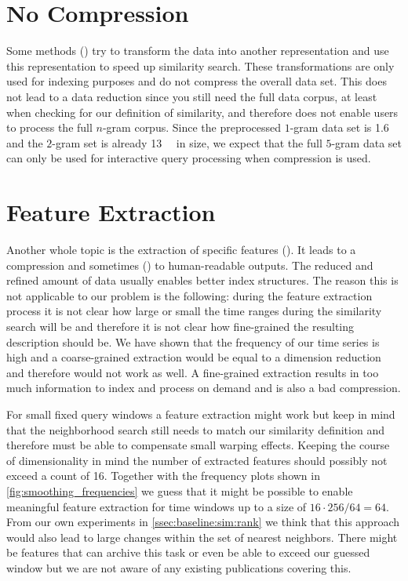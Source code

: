 \section{No Compression}
\label{sec:prior:nocompression}

Some methods (\cite{dimred3,dimred4}) try to transform the data into another representation and use this representation to speed up similarity search. These transformations are only used for indexing purposes and do not compress the overall data set. This does not lead to a data reduction since you still need the full data corpus, at least when checking for our definition of similarity, and therefore does not enable users to process the full $n$-gram corpus. Since the preprocessed $1$-gram data set is \SI{1.6}{\giga\byte} and the $2$-gram set is already \SI{13}{\giga\byte} in size, we expect that the full $5$-gram data set can only be used for interactive query processing when compression is used.



\section{Feature Extraction}
\label{sec:prior:extract}

Another whole topic is the extraction of specific features (\cite{compress1,compress2,compress3,compress4,compress5}). It leads to a compression and sometimes (\cite{compress1}) to human-readable outputs. The reduced and refined amount of data usually enables better index structures. The reason this is not applicable to our problem is the following: during the feature extraction process it is not clear how large or small the time ranges during the similarity search will be and therefore it is not clear how fine-grained the resulting description should be. We have shown that the frequency of our time series is high and a coarse-grained extraction would be equal to a dimension reduction and therefore would not work as well. A fine-grained extraction results in too much information to index and process on demand and is also a bad compression.

For small fixed query windows a feature extraction might work but keep in mind that the neighborhood search still needs to match our similarity definition and therefore must be able to compensate small warping effects. Keeping the course of dimensionality in mind the number of extracted features should possibly not exceed a count of \num{16}. Together with the frequency plots shown in \autoref{fig:smoothing_frequencies} we guess that it might be possible to enable meaningful feature extraction for time windows up to a size of $16 \cdot 256/64 = 64$. From our own experiments in \autoref{ssec:baseline:sim:rank} we think that this approach would also lead to large changes within the set of nearest neighbors. There might be features that can archive this task or even be able to exceed our guessed window but we are not aware of any existing publications covering this.



